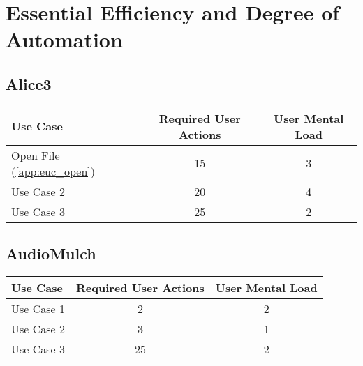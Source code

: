 \section{Essential Efficiency and Degree of Automation}

\subsection{Alice3}


\begin{tabular*}{\textwidth}{lcc}
\textbf{Use Case} & \textbf{Required User Actions} & \textbf{User Mental Load}\\
\hline
Open File (\ref{app:euc_open}) & 15 & 3 \\
Use Case 2                          & 20 & 4 \\
Use Case 3                          & 25 & 2
\end{tabular*}

\subsection{AudioMulch}




\begin{tabular*}{\textwidth}{lcc}
\textbf{Use Case} & \textbf{Required User Actions} & \textbf{User Mental Load}\\
\hline
Use Case 1                          & 2 & 2 \\
Use Case 2                          & 3 & 1 \\
Use Case 3                          & 25 & 2
\end{tabular*}

